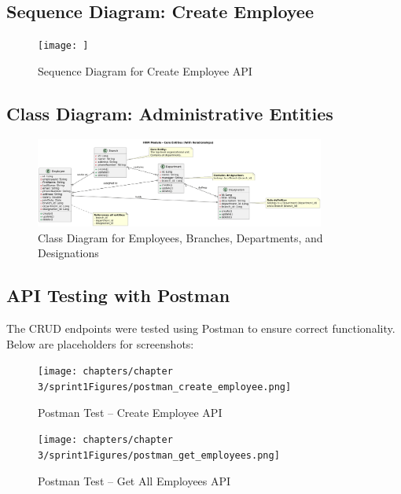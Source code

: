\subsection{Sequence Diagram: Create Employee}
\begin{figure}[H]
    \centering
    \texttt{[image: ]}
    \caption{Sequence Diagram for Create Employee API}
    \label{fig:sprint1_sequence}
\end{figure}

\subsection{Class Diagram: Administrative Entities}
\begin{figure}[H]
    \centering
    \includegraphics[width=0.85\textwidth]{chapters/chapter 3/sprint1_figures/class_diagram_s1.png}
    \caption{Class Diagram for Employees, Branches, Departments, and Designations}
    \label{fig:sprint1_class}
\end{figure}

\subsection{API Testing with Postman}
The CRUD endpoints were tested using Postman to ensure correct functionality. Below are placeholders for screenshots:

\begin{figure}[H]
    \centering
    \texttt{[image: chapters/chapter 3/sprint1Figures/postman\_create\_employee.png]}
    \caption{Postman Test -- Create Employee API}
    \label{fig:postman_create_employee}
\end{figure}

\begin{figure}[H]
    \centering
    \texttt{[image: chapters/chapter 3/sprint1Figures/postman\_get\_employees.png]}
    \caption{Postman Test -- Get All Employees API}
    \label{fig:postman_get_employees}
\end{figure}

